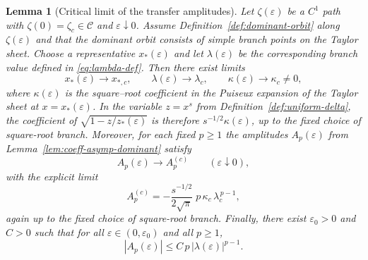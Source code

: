 \documentclass[11pt]{amsart}
\numberwithin{equation}{section}
\theoremstyle{plain}
\newtheorem{lemma}[theorem]{Lemma}
\theoremstyle{definition}
\theoremstyle{remark}
\begin{document}
\begin{lemma}[Critical limit of the transfer amplitudes]\label{lem:critical-coeff-asymp}
	Let $\zeta(\varepsilon)$ be a $C^1$ path with $\zeta(0)=\zeta_c\in\mathcal C$ and $\varepsilon\downarrow0$.
	Assume Definition~\ref{def:dominant-orbit} along $\zeta(\varepsilon)$ and that the dominant orbit consists
	of simple branch points on the Taylor sheet. Choose a representative $x_*(\varepsilon)$ and let
	$\lambda(\varepsilon)$ be the corresponding branch value defined in \eqref{eq:lambda-def}.
	Then there exist limits
	\[
		x_*(\varepsilon)\to x_{*,c},\qquad
		\lambda(\varepsilon)\to \lambda_c,\qquad
		\kappa(\varepsilon)\to\kappa_c\neq0,
	\]
	where $\kappa(\varepsilon)$ is the square--root coefficient in the Puiseux expansion of the Taylor sheet
	at $x=x_*(\varepsilon)$. In the variable \(z=x^s\) from
	Definition~\ref{def:uniform-delta}, the coefficient of
	\(\sqrt{1-z/z_*(\varepsilon)}\) is therefore
	\(s^{-1/2}\kappa(\varepsilon)\), up to the fixed choice of square-root branch.
	Moreover, for each fixed $p\ge1$ the amplitudes $A_p(\varepsilon)$ from Lemma~\ref{lem:coeff-asymp-dominant}
	satisfy
	\[
		A_p(\varepsilon)\to A_p^{(c)}\qquad (\varepsilon\downarrow0),
	\]
	with the explicit limit
	\begin{equation}\label{eq:Ap-critical-explicit}
	A_p^{(c)}
	=
	-\frac{s^{-1/2}}{2\sqrt{\pi}}\;p\,\kappa_c\,\lambda_c^{\,p-1},
	\end{equation}
	again up to the fixed choice of square-root branch. Finally, there exist $\varepsilon_0>0$ and
	$C>0$ such that for all $\varepsilon\in(0,\varepsilon_0)$ and all $p\ge1$,
	\[
		|A_p(\varepsilon)|\le C\,p\,|\lambda(\varepsilon)|^{p-1}.
	\]
\end{lemma}
\end{document}
